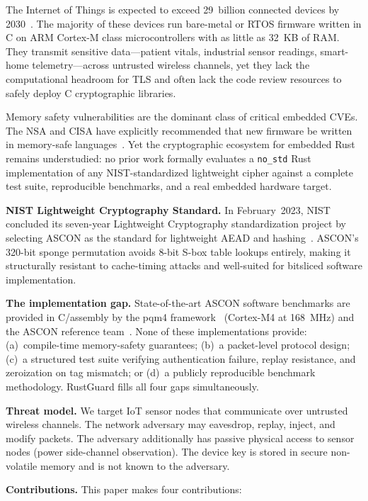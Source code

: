 \documentclass[anonymous]{ndss}
\newcommand{\nstd}{\texttt{no\_std}}
\begin{document}
The Internet of Things is expected to exceed 29~billion connected devices
by 2030~\cite{b1}. The majority of these devices run bare-metal or RTOS
firmware written in C on ARM Cortex-M class microcontrollers with as little
as 32~KB of RAM. They transmit sensitive data---patient vitals, industrial
sensor readings, smart-home telemetry---across untrusted wireless channels,
yet they lack the computational headroom for TLS and often lack the code
review resources to safely deploy C cryptographic libraries.

Memory safety vulnerabilities are the dominant class of critical
embedded CVEs. The NSA and CISA have explicitly recommended that new
firmware be written in memory-safe languages~\cite{b16}. Yet the
cryptographic ecosystem for embedded Rust remains understudied: no prior
work formally evaluates a \nstd{} Rust implementation of any
NIST-standardized lightweight cipher against a complete test suite,
reproducible benchmarks, and a real embedded hardware target.

\textbf{NIST Lightweight Cryptography Standard.}
In February~2023, NIST concluded its seven-year Lightweight Cryptography
standardization project by selecting ASCON as the standard for lightweight
AEAD and hashing~\cite{b5}. ASCON's 320-bit sponge permutation avoids
8-bit S-box table lookups entirely, making it structurally resistant to
cache-timing attacks and well-suited for bitsliced software implementation.

\textbf{The implementation gap.}
State-of-the-art ASCON software benchmarks are provided in C/assembly by
the pqm4 framework~\cite{b10} (Cortex-M4 at 168~MHz) and the ASCON
reference team~\cite{b12}. None of these implementations provide:
(a)~compile-time memory-safety guarantees;
(b)~a packet-level protocol design;
(c)~a structured test suite verifying authentication failure, replay
resistance, and zeroization on tag mismatch; or
(d)~a publicly reproducible benchmark methodology.
RustGuard fills all four gaps simultaneously.

\textbf{Threat model.}
We target IoT sensor nodes that communicate over untrusted wireless channels.
The network adversary may eavesdrop, replay, inject, and modify packets.
The adversary additionally has passive physical access to sensor nodes
(power side-channel observation). The device key is stored in secure
non-volatile memory and is not known to the adversary.

\textbf{Contributions.} This paper makes four contributions:
\end{document}
